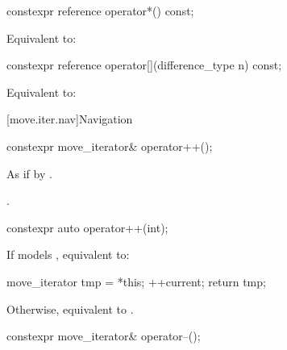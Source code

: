 \documentclass{wg21}
\begin{document}
%
\begin{itemdecl}
	constexpr reference operator*() const;
\end{itemdecl}

\begin{itemdescr}
	\pnum
	\effects Equivalent to: 
\end{itemdescr}

%
\begin{itemdecl}
	constexpr reference operator[](difference_type n) const;
\end{itemdecl}

\begin{itemdescr}
	\pnum
	\effects Equivalent to: 
\end{itemdescr}

[move.iter.nav]{Navigation}

%
\begin{itemdecl}
	constexpr move_iterator& operator++();
\end{itemdecl}

\begin{itemdescr}
	\pnum
	\effects As if by .
	
	\pnum
	\returns {}.
\end{itemdescr}

%
\begin{itemdecl}
	constexpr auto operator++(int);
\end{itemdecl}

\begin{itemdescr}
	\pnum
	\begin{addedm}
		\mandates
	\end{addedm}

	\effects
	If  models , equivalent to:
	\begin{codeblock}
		move_iterator tmp = *this;
		++current;
		return tmp;
	\end{codeblock}
	Otherwise, equivalent to .
\end{itemdescr}

%
\begin{itemdecl}
	constexpr move_iterator& operator--();
\end{itemdecl}
\end{document}
